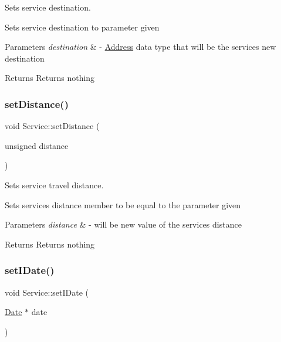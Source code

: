 Sets service destination. 

Sets service destination to parameter given 
\begin{DoxyParams}{Parameters}
{\em destination} & -\/ \hyperlink{class_address}{Address} data type that will be the service\textquotesingle{}s new destination \\
\hline
\end{DoxyParams}
\begin{DoxyReturn}{Returns}
Returns nothing 
\end{DoxyReturn}
\mbox{\label{class_service_a6349774a4ab8afffe88dc51025690650}} 
\subsubsection{\texorpdfstring{set\+Distance()}{setDistance()}}
{\footnotesize\ttfamily void Service\+::set\+Distance (\begin{DoxyParamCaption}\item[{unsigned}]{distance }\end{DoxyParamCaption})}



Sets service travel distance. 

Sets service\textquotesingle{}s distance member to be equal to the parameter given 
\begin{DoxyParams}{Parameters}
{\em distance} & -\/ will be new value of the service\textquotesingle{}s distance \\
\hline
\end{DoxyParams}
\begin{DoxyReturn}{Returns}
Returns nothing 
\end{DoxyReturn}
\mbox{\label{class_service_ac4635d11b13279a4ef84b1c6378639d4}} 
\subsubsection{\texorpdfstring{set\+I\+Date()}{setIDate()}}
{\footnotesize\ttfamily void Service\+::set\+I\+Date (\begin{DoxyParamCaption}\item[{\hyperlink{class_date}{Date} $\ast$}]{date }\end{DoxyParamCaption})}



